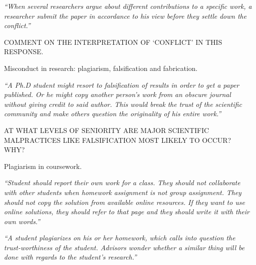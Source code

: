 \documentclass[portrait,11pt]{seminar}
\begin{document}
\es

\bs



{\it ``When several researchers argue about different contributions to a specific work,
a researcher submit the paper in accordance to his view before they settle down
the conflict.''}

\medskip

COMMENT ON THE INTERPRETATION OF `CONFLICT' IN THIS RESPONSE.


\es

\bs

  Misconduct in research: plagiarism, falsification and fabrication.



{\it ``A Ph.D student might resort to falsification of results in order to get a paper published. Or he might copy another person’s work from an obscure journal without giving credit to said author. This would break the trust of the scientific community and make others question the originality of his entire work.''}

\medskip

AT WHAT LEVELS OF SENIORITY ARE MAJOR SCIENTIFIC MALPRACTICES LIKE FALSIFICATION MOST LIKELY TO OCCUR? WHY?

\es

\bs

  Plagiarism in coursework.




{\it ``Student should report their own work for a class. They should not collaborate with other students when homework assignment is not group assignment. They should not copy the solution from available online resources. If they want to use online solutions, they should refer to that page and they should write it with their own words.''}

\medskip

{\it ``A student plagiarizes on his or her homework, which calls into question the trust-worthiness of the student. Advisors wonder whether a similar thing will be done with regards to the student's research.''}
\end{document}
